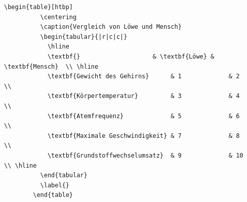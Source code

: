 \begin{frame}[fragile]
	\Code
	\begin{lstlisting}[gobble=8]
        \begin{table}[htbp]
          \centering
          \caption{Vergleich von Löwe und Mensch}
          \begin{tabular}{|r|c|c|}
            \hline 
            \textbf{}                    & \textbf{Löwe} & \textbf{Mensch}  \\ \hline 
            \textbf{Gewicht des Gehirns}      & 1             & 2           \\
            \textbf{Körpertemperatur}         & 3             & 4           \\
            \textbf{Atemfrequenz}             & 5             & 6           \\
            \textbf{Maximale Geschwindigkeit} & 7             & 8           \\ 
            \textbf{Grundstoffwechselumsatz}  & 9             & 10          \\ \hline 
          \end{tabular} 
          \label{}
        \end{table}
	\end{lstlisting}
\end{frame}
